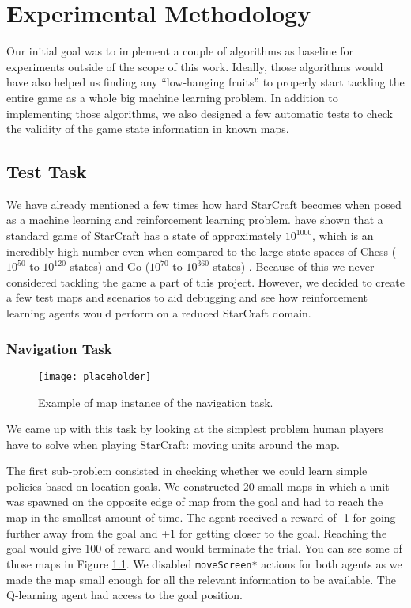 \chapter{Experimental Methodology} 

Our initial goal was to implement a couple of algorithms as baseline for
experiments outside of the scope of this work. Ideally, those algorithms would
have also helped us finding any ``low-hanging fruits'' to properly start
tackling the entire game as a whole big machine learning problem. In addition to
implementing those algorithms, we also designed a few automatic tests to check
the validity of the game state information in known maps.

\section{Test Task}

We have already mentioned a few times how hard StarCraft becomes when posed as a
machine learning and reinforcement learning problem. \cite{} have shown that a
standard game of StarCraft has a state of approximately $10^{1000}$, which is an
incredibly high number even when compared to the large state spaces of Chess
($10^{50}$ to $10^{120}$ states) and Go ($10^{70}$ to $10^{360}$ states)
\citep{papadimitriou2003computational}. Because of this we never considered
tackling the game a part of this project. However, we decided to create a few
test maps and scenarios to aid debugging and see how reinforcement learning
agents would perform on a reduced StarCraft domain.

\subsection{Navigation Task}

\begin{figure}[h]
    \centering
    \texttt{[image: placeholder]}
    \caption{Example of map instance of the navigation task.}
    \label{fig:nav_task}
\end{figure}

We came up with this task by looking at the simplest problem human players have
to solve when playing StarCraft: moving units around the map.

The first sub-problem consisted in checking whether we could learn simple
policies based on location goals. We constructed 20 small maps in which a unit
was spawned on the opposite edge of map from the goal and had to reach the map
in the smallest amount of time. The agent received a reward of -1 for going
further away from the goal and +1 for getting closer to the goal. Reaching the
goal would give 100 of reward and would terminate the trial. You can see some of
those maps in Figure \ref{fig:nav_task}. We disabled \texttt{moveScreen*}
actions for both agents as we made the map small enough for all the relevant
information to be available. The Q-learning agent had access to the goal
position.

